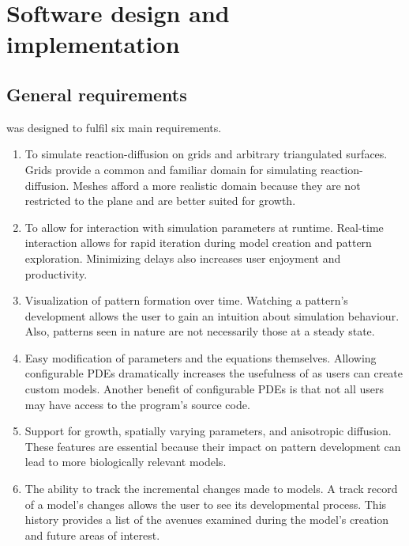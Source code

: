 \chapter{Software design and  implementation}
\section{General requirements} %
\ProgramName{} was designed to fulfil six main requirements.

\begin{enumerate}
	\item To simulate reaction-diffusion on grids and arbitrary triangulated surfaces. Grids provide a common and familiar domain for simulating reaction-diffusion. Meshes afford a more realistic domain because they are not restricted to the plane and are better suited for growth. 
	
	\item To allow for interaction with simulation parameters at runtime. Real-time interaction allows for rapid iteration during model creation and pattern exploration. Minimizing delays also increases user enjoyment and productivity. %

	\item Visualization of pattern formation over time. Watching a pattern's development allows the user to gain an intuition about simulation behaviour. Also, patterns seen in nature are not necessarily those at a steady state.
	
	\item Easy modification of parameters and the equations themselves. Allowing configurable PDEs dramatically increases the usefulness of \ProgramName{} as users can create custom models. Another benefit of configurable PDEs is that not all users may have access to the program's source code. 
		
	\item Support for growth, spatially varying parameters, and anisotropic diffusion. These features are essential because their impact on pattern development can lead to more biologically relevant models. 
	
	\item The ability to track the incremental changes made to models. A track record of a model's changes allows the user to see its developmental process. This history provides a list of the avenues examined during the model's creation and future areas of interest.
\end{enumerate}

